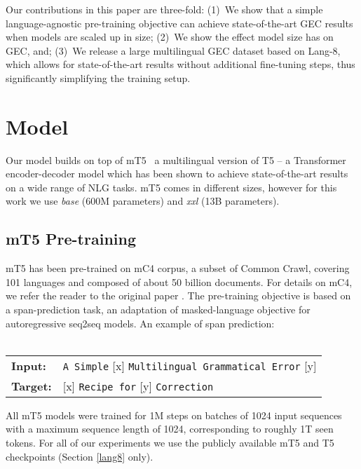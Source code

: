 \documentclass[11pt,a4paper]{article}
\begin{document}
Our contributions in this paper are three-fold: (1)~We show that a simple language-agnostic pre-training objective can achieve state-of-the-art GEC results when models are scaled up in size; (2)~We show the effect model size has on GEC, and; (3)~We release a large multilingual GEC dataset based on Lang-8, which allows for state-of-the-art results without additional fine-tuning steps, thus significantly simplifying the training setup.

\section{Model}
Our model builds on top of mT5~\citep{mt5} a multilingual version of T5 \citep{t5} -- a Transformer encoder-decoder model which has been shown to achieve state-of-the-art results on a wide range of NLG tasks. 
mT5 comes in different sizes, however for this work we use \emph{base} (600M parameters) and \emph{xxl} (13B parameters).

\subsection{mT5 Pre-training}\label{task-agnostic-pre-training}
mT5 has been pre-trained on mC4 corpus, a subset of Common Crawl, covering 101 languages and composed of about 50 billion documents. 
For details on mC4, we refer the reader to the original paper \citep{mt5}.
The pre-training objective is based on a span-prediction task, an adaptation of masked-language objective for autoregressive seq2seq models.
An example of span prediction:\\
\\
{\footnotesize
\setlength{\parindent}{3pt}
\begin{tabularx}{\columnwidth}{lX}
\textbf{Input:} & \texttt{A Simple} [x] \texttt{Multilingual Grammatical Error} [y] \\[1.3em]
\textbf{Target:} & [x] \texttt{Recipe for} [y] \texttt{Correction} \\[1em]
\end{tabularx}
}

{\setlength{\parindent}{0pt}
 All mT5 models were trained for 1M steps on batches of 1024 input sequences with a maximum sequence length of 1024, corresponding to roughly 1T seen tokens.}
For all of our experiments we use the publicly available mT5 and T5 checkpoints (Section \ref{lang8} only).
\end{document}
